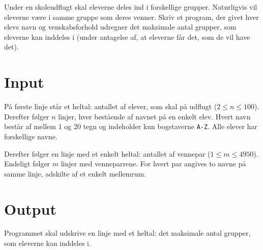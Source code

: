 
Under en skoleudflugt skal eleverne deles ind i forskellige grupper.
Naturligvis vil eleverne være i samme gruppe som deres venner.
Skriv et program, der givet hver elevs navn og venskabsforhold udregner det maksimale antal grupper, som eleverne kan inddeles i (under antagelse af, at eleverne får det, som de vil have det).

\section*{Input}

På første linje står et heltal: antallet af elever, som skal på udflugt ($2 \le n \le 100$).
Derefter følger $n$ linjer, hver bestående af navnet på en enkelt elev.
Hvert navn består af mellem $1$ og $20$ tegn og indeholder kun bogstaverne \texttt{A-Z}.
Alle elever har forskellige navne.

Derefter følger en linje med et enkelt heltal: antallet af vennepar ($1 \le m \le 4950$).
Endeligt følger $m$ linjer med venneparrene.
For hvert par angives to navne på samme linje, adskilte af et enkelt mellemrum.

\section*{Output}
Programmet skal udskrive en linje med et heltal: det maksimale antal grupper, som eleverne kan inddeles i.
